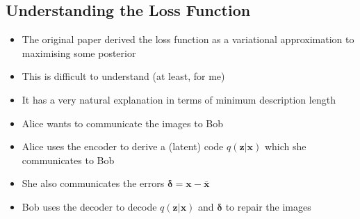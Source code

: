 \begin{slide}
\section[-2]{Understanding the Loss Function}

\begin{PauseHighLight}
  \begin{itemize}\squeeze
  \item The original paper derived the loss function as a variational
    approximation to maximising some posterior\pause
  \item This is difficult to understand (at least, for me)\pause
  \item It has a very natural explanation in terms of minimum
    description length\pause
  \item Alice wants to communicate the images to Bob\pause
  \item Alice uses the encoder to derive a (latent) code
    $q(\bm{z}|\bm{x})$ which she communicates to Bob\pause
  \item She also communicates the errors $\bm{\delta}=\bm{x}-\bar{\bm{x}}$\pause
  \item Bob uses the decoder to decode $q(\bm{z}|\bm{x})$ and
    $\bm{\delta}$ to repair the images\pause
  \end{itemize}
\end{PauseHighLight}


\end{slide}


